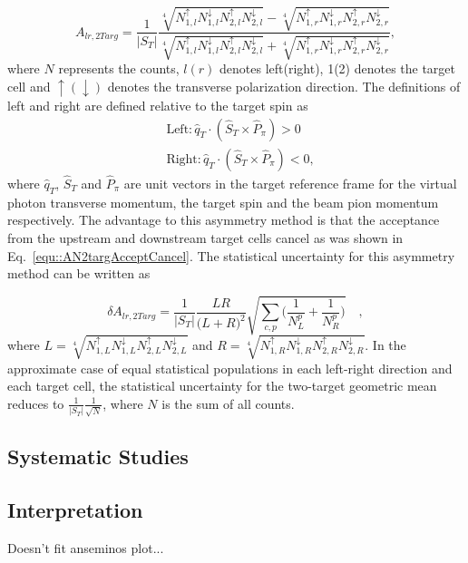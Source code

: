 \begin{equation}
  \label{equ::AN4TargGeomeanJPsi}
  A_{lr,2Targ} =
  \frac{1}{|S_T|}
  \frac{ \sqrt[4]{ N_{1,l}^\uparrow N_{1, l}^\downarrow
      N_{2,l}^\uparrow N_{2, l}^\downarrow }
    - \sqrt[4]{ N_{1,r}^\uparrow N_{1,r}^\downarrow
      N_{2,r}^\uparrow N_{2,r}^\downarrow }
  }{
    \sqrt[4]{ N_{1,l}^\uparrow N_{1, l}^\downarrow
      N_{2,l}^\uparrow N_{2, l}^\downarrow }
    + \sqrt[4]{ N_{1,r}^\uparrow N_{1,r}^\downarrow
      N_{2,r}^\uparrow N_{2,r}^\downarrow } },
\end{equation}
\noindent
where $N$ represents the counts, $l(r)$ denotes left(right), 1(2) denotes the
target cell and $\uparrow(\downarrow)$ denotes the transverse polarization
direction.  The definitions of left and right are defined relative to the target
spin as
\begin{equation}
  \begin{aligned}
    &\text{Left}: \hat{q}_T \cdot (\hat{S}_T \times \hat{P}_{\pi}) > 0 \\
    &\text{Right}: \hat{q}_T \cdot (\hat{S}_T \times \hat{P}_{\pi}) < 0, 
  \end{aligned}
\end{equation}
\noindent
where $\hat{q}_T$, $\hat{S}_T$ and $\hat{P}_{\pi}$ are unit vectors in the
target reference frame for the virtual photon transverse momentum, the target
spin and the beam pion momentum respectively.  The advantage to this asymmetry
method is that the acceptance from the upstream and downstream target cells
cancel as was shown in Eq.~\ref{equ::AN2targAcceptCancel}.  The statistical
uncertainty for this asymmetry method can be written as

\begin{equation}
  \delta A_{lr,2Targ} = \frac{1}{|S_T|}
  \frac{LR}{\Big( L+R \Big)^2}
  \sqrt{
    \sum_{c,p}
    \Big(
    \frac{1}{N_L^{p}}
    + \frac{1}{N_R^p}
    \Big)
  } \quad,
\end{equation}
where $L =\sqrt[4]{N_{1,L}^\uparrow N_{1,L}^\downarrow N_{2,L}^\uparrow
  N_{2,L}^\downarrow}$ and $R =\sqrt[4]{N_{1,R}^\uparrow N_{1,R}^\downarrow
  N_{2,R}^\uparrow N_{2,R}^\downarrow}$.  In the approximate case of equal
statistical populations in each left-right direction and each target cell, the
statistical uncertainty for the two-target geometric mean reduces to
$\frac{1}{|S_T|}\frac{1}{\sqrt{N}}$, where $N$ is the sum of all counts.

\subsection{Systematic Studies}

\subsection{Interpretation}

Doesn't fit anseminos plot...
